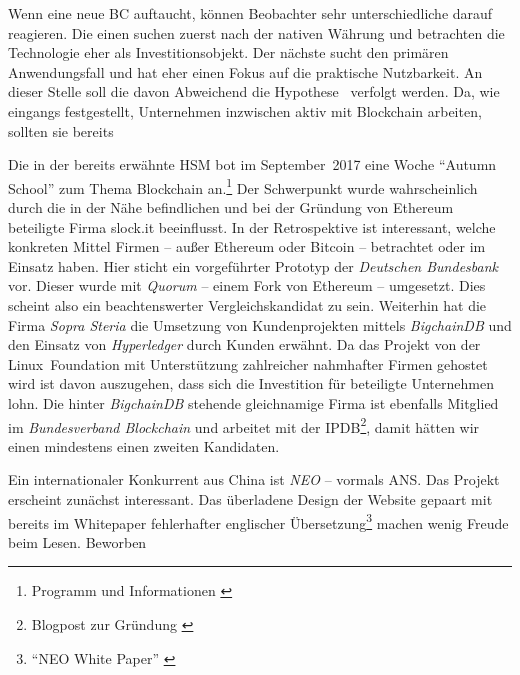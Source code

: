 

Wenn eine neue \gls{BC} auftaucht, können Beobachter sehr unterschiedliche darauf reagieren.
Die einen suchen zuerst nach der nativen Währung und betrachten die Technologie eher als Investitionsobjekt.
Der nächste sucht den primären Anwendungsfall und hat eher einen Fokus auf die praktische Nutzbarkeit.
An dieser Stelle soll die davon Abweichend die Hypothese~ verfolgt werden. Da, wie eingangs festgestellt, Unternehmen inzwischen aktiv mit Blockchain arbeiten, sollten sie bereits 

Die in der  bereits erwähnte \gls{HSM} bot im September~2017 eine Woche \enquote{Autumn School} zum Thema Blockchain an.\footnote{Programm und Informationen \autocite{w:hsmw-bccm-as}} Der Schwerpunkt wurde wahrscheinlich durch die in der Nähe befindlichen und bei der Gründung von Ethereum beteiligte Firma \mbox{slock.it} beeinflusst. In der Retrospektive ist interessant, welche konkreten Mittel Firmen -- außer Ethereum oder Bitcoin -- betrachtet oder im Einsatz haben.
Hier sticht ein vorgeführter Prototyp der \emph{Deutschen Bundesbank} vor. Dieser wurde mit \emph{Quorum} -- einem Fork von Ethereum -- umgesetzt. Dies scheint also ein beachtenswerter Vergleichskandidat zu sein. Weiterhin hat die Firma \emph{Sopra Steria} die Umsetzung von Kundenprojekten mittels \emph{BigchainDB} und den Einsatz von \emph{Hyperledger} durch Kunden erwähnt.
Da das Projekt von der \mbox{Linux Foundation} mit Unterstützung zahlreicher nahmhafter Firmen gehostet wird ist davon auszugehen, dass sich die Investition für beteiligte Unternehmen lohn. Die hinter \emph{BigchainDB} stehende gleichnamige Firma ist ebenfalls Mitglied im \emph{Bundesverband Blockchain} und arbeitet mit der \gls{IPDB}\footnote{Blogpost zur Gründung \autocite{w:ipdb-foundation}}, damit hätten wir einen mindestens einen zweiten Kandidaten.

Ein internationaler Konkurrent aus China ist \emph{NEO} -- vormals \gls{ANS}. Das Projekt erscheint zunächst interessant. Das überladene Design der Website gepaart mit bereits im Whitepaper fehlerhafter englischer Übersetzung\footnote{\enquote{NEO White Paper} \autocite{w:neo-whitepaper}} machen wenig Freude beim Lesen. Beworben

